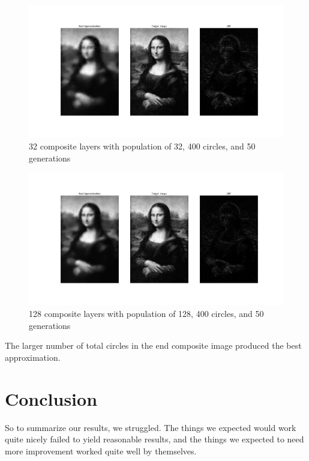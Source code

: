 \documentclass{article}
\begin{document}
\begin{figure}[H]
    \centering
    \includegraphics[width=\textwidth]{output/average32_c400p32g50.png}
    \caption{32 composite layers with population of 32, 400 circles, and 50
        generations}\label{fig:composite-32}
\end{figure}

\begin{figure}[H]
    \centering
    \includegraphics[width=\textwidth]{output/average64_c400p10g50l64.png}
    \caption{128 composite layers with population of 128, 400 circles, and 50
        generations}\label{fig:composite-128}
\end{figure}

The larger number of total circles in the end composite image produced the best approximation.

\section{Conclusion}
So to summarize our results, we struggled. The things we expected would work quite nicely failed to
yield reasonable results, and the things we expected to need more improvement worked quite well by
themselves.
\end{document}
